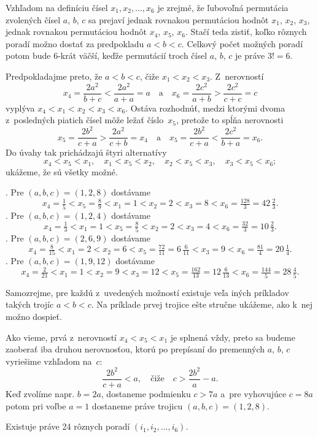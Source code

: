 {%
Vzhľadom na definíciu čísel $x_1, x_2, \dots, x_6$ je zrejmé, že ľubovoľná permutácia
zvolených čísel $a$, $b$, $c$ sa prejaví jednak rovnakou permutáciou hodnôt $x_1$, $ x_2$, $x_3$,
jednak rovnakou permutáciou hodnôt $x_4$, $ x_5$, $ x_6$.
Stačí teda zistiť, koľko rôznych poradí možno dostať za predpokladu $a<b<c$.
Celkový počet možných poradí potom bude 6-krát väčší, keďže permutácií troch čísel
$a$, $b$, $c$ je práve $3!=6$.

Predpokladajme preto, že $a<b<c$, čiže $x_1<x_2<x_3$. Z~nerovností
$$
x_4 = \frac {2a^2} {b+c} <\frac {2a^2} {a+a} = a\quad \text {a} \quad
x_6 = \frac {2c^2} {a+b}> \frac {2c^2} {c+c} = c
$$
vyplýva $x_4 <x_1 <x_2 <x_3 <x_6$. Ostáva rozhodnúť, medzi ktorými dvoma
z~posledných piatich čísel môže ležať číslo~$x_5$, pretože to spĺňa nerovnosti
$$
x_5 = \frac {2b^2} {c+a}> \frac {2a^2} {c+b} = x_4 \quad \text {a} \quad
x_5 = \frac {2b^2} {c+a} <\frac {2c^2} {b+a} = x_6.
$$
Do úvahy tak prichádzajú štyri alternatívy
$$
x_4 < x_5 <x_1, \quad x_1 <x_5 <x_2, \quad x_2 <x_5 <x_3, \quad
x_3 <x_5<x_6;
$$
ukážeme, že sú všetky možné.

.
Pre $(a, b, c) = (1, 2, 8)$ dostávame
$$
x_4 = \tfrac 15 <x_5 = \tfrac 89 <x_1 = 1 <x_2 = 2 <x_3 = 8 <
x_6 = \tfrac {128} {3} = 42\,\tfrac 23.
$$
.
Pre $(a, b, c) = (1, 2, 4)$ dostávame
$$
x_4 = \tfrac 13 <x_1 = 1 <x_5 = \tfrac 85 <x_2 = 2 <x_3 = 4 <
x_6 = \tfrac {32} {3} = 10\,\tfrac 23.
$$
.
Pre $(a, b, c) = (2, 6, 9)$ dostávame
$$
x_4 = \tfrac 8 {15} <x_1 = 2 <x_2 = 6 <x_5 = \tfrac {72} {11} = 6\,\tfrac 6 {11} <
x_3 = 9 <x_6 = \tfrac {81} {4} = 20\,\tfrac 14.
$$
.
Pre $(a, b, c) = (1, 9, 12)$ dostávame
$$
x_4 = \tfrac 2 {21} <x_1 = 1 <x_2 = 9 <x_3 = 12 <x_5 = \tfrac {162} {13} = 12\,\tfrac
6 {13} <x_6 = \tfrac {144} {5} = 28\,\tfrac 45.
$$

Samozrejme, pre každú z~uvedených možností existuje veľa iných príkladov takých trojíc $a<b <c$.
Na príklade prvej trojice ešte stručne ukážeme, ako k~nej možno dospieť.

Ako vieme, prvá z~nerovností $x_4<x_5<x_1$ je splnená vždy, preto sa
budeme zaoberať iba druhou nerovnosťou, ktorú po prepísaní do premenných
$a$, $b$, $c$ vyriešime vzhľadom na~$c$:
$$
\frac{2b^2}{c+a}<a,\quad\text{čiže}\quad c>\frac{2b^2}{a}-a.
$$
Keď zvolíme napr. $b = 2a$, dostaneme podmienku $c>7a$ a~pre vyhovujúce
$c = 8a$ potom pri voľbe $a=1$ dostaneme práve trojicu $(a,b,c) = (1, 2, 8)$.


\odpoved
Existuje práve 24 rôznych poradí $(i_1, i_2, \dots, i_6)$.



}
